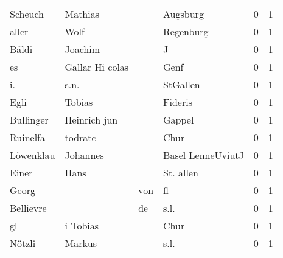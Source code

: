 \documentclass[10pt,a4paper,landscape]{article}
\begin{document}
\begin{longtable}{llllrr}
                  Scheuch &                            Mathias &             &                                    Augsburg &          0 &         1 \\
                    aller &                               Wolf &             &                                   Regenburg &          0 &         1 \\
                    Bäldi &                            Joachim &             &                                           J &          0 &         1 \\
                       es &                    Gallar Hi colas &             &                                        Genf &          0 &         1 \\
                       i. &                               s.n. &             &                                    StGallen &          0 &         1 \\
                     Egli &                             Tobias &             &                                     Fideris &          0 &         1 \\
                Bullinger &                       Heinrich jun &             &                                      Gappel &          0 &         1 \\
                 Ruinelfa &                            todratc &             &                                        Chur &          0 &         1 \\
                Löwenklau &                           Johannes &             &                           Basel LenneUviutJ &          0 &         1 \\
                    Einer &                               Hans &             &                                   St. allen &          0 &         1 \\
                    Georg &                                    &         von &                                          fl &          0 &         1 \\
                Bellievre &                                    &          de &                                        s.l. &          0 &         1 \\
                       gl &                           i Tobias &             &                                        Chur &          0 &         1 \\
                   Nötzli &                             Markus &             &                                        s.l. &          0 &         1 \\

\end{longtable}
\end{document}
